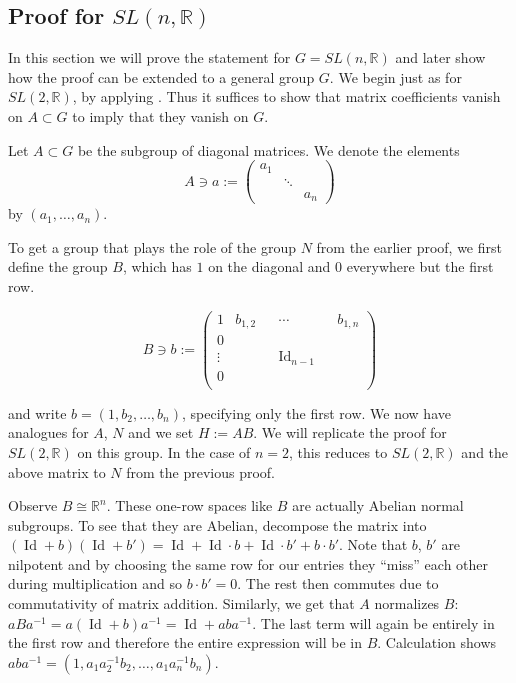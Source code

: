 \documentclass[
  12pt
]{article}
\numberwithin{equation}{section}
\theoremstyle{plain}
\newcommand{\G}{\ensuremath{G}\xspace}
\newcommand{\bbr}{\ensuremath{\mathbb{R}}\xspace}
\newcommand{\sltr}{\ensuremath{SL(2, \mathbb{R})}\xspace}
\newcommand{\slnr}{\ensuremath{SL(n, \mathbb{R})}\xspace}
\DeclareMathOperator{\Id}{Id}
\begin{document}
\hypertarget{proof-for-slnr}{%
  \subsection{Proof for \texorpdfstring{$SL(n, \mathbb{R})$}{SL(n, R)}}
\label{proof-for-slnr}}




  In this section we will prove the statement for $G = \slnr$ and later show how
  the proof can be extended to a general group \G. We begin just as for \sltr, by
  applying . Thus it suffices to show that
  matrix coefficients vanish on $A \subset G$ to imply that they vanish on \G.

  Let $A \subset G$ be the subgroup of diagonal matrices. We denote the elements
  $$
  A \ni a := \begin{pmatrix}
    a_1 & & \\
        & \ddots & \\
        & & a_n
  \end{pmatrix}
  $$
  by $(a_1, \dots, a_n)$.

  To get a group that plays the role of the group $N$ from the earlier proof,
  we first define the group $B$, which has $1$ on the diagonal and $0$
  everywhere but the first row.

  $$
    B \ni b := \begin{pmatrix}
      1 & b_{1,2} & & \cdots & & b_{1,n} \\
      0 & & &  & \\
      \vdots & & & \Id_{n-1} & \\
      0 & & & & \\
    \end{pmatrix}
  $$

  and write $b = (1, b_2, \dots, b_n)$, specifying only the first row.
  We now have analogues for $A$, $N$ and we set $H:=AB$. We will replicate the proof for \sltr on this group.
  In the case of $n = 2$, this reduces to \sltr and the above matrix to $N$ from the previous proof.

  Observe $B \cong \bbr^n$.
  These one-row spaces like $B$ are actually Abelian normal subgroups.
  To see that they are Abelian, decompose the matrix into $(\Id + b)(\Id +b') = \Id + \Id\cdot b + \Id\cdot b' + b\cdot b'$.
  Note that $b$, $b'$ are nilpotent and by choosing the same row for our entries they
  ``miss'' each other during multiplication and so $b\cdot b' =0$. The rest then commutes
  due to commutativity of matrix addition.
  Similarly, we get that $A$ normalizes $B$: $aBa^{-1} = a(\Id + b)a^{-1} = \Id + aba^{-1}$.
  The last term will again be entirely in the first row and therefore the entire expression will be in $B$.
  Calculation shows $aba^{-1} = (1, a_1a_2^{-1}b_2, \dots, a_1a_n^{-1}b_n)$.
\end{document}
